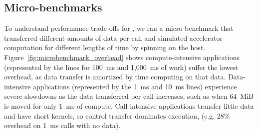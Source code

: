 \subsection{Micro-benchmarks}

To understand performance trade-offs for \model,
we ran a micro-benchmark that transferred different amounts of data per call and simulated accelerator computation for different lengths of time by spinning on the host.
Figure~\ref{fig:microbenchmark_overhead} shows compute-intensive applications (represented by the lines for 100~ms and 1,000~ms of work) suffer the lowest overhead, as data transfer is amortized by time computing on that data.
Data-intensive applications (represented by the 1~ms and 10~ms lines) experience severe slowdowns as the data transferred per call increases, such as when 64~MiB is moved for only 1~ms of compute.
Call-intensive applications transfer little data and have short kernels, so control transfer dominates execution, (e.g. 28\% overhead on 1~ms calls with no data).

